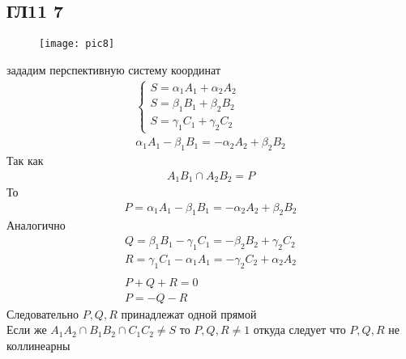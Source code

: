 \subsection*{ГЛ11 7}
\begin{figure}[h]
	\texttt{[image: pic8]}
\end{figure}
зададим перспективную систему координат
\begin{gather*}
	\begin{cases}
		S = \alpha_1 A_1 + \alpha_2 A_2\\
		S = \beta_1 B_1 + \beta_2 B_2\\
		S = \gamma_1 C_1 + \gamma_2 C_2
	\end{cases}
	\\
	\alpha_1 A_1 - \beta_1 B_1 = -\alpha_2 A_2 + \beta_2 B_2
\end{gather*}
Так как 
\begin{gather*}
	A_1B_1 \cap A_2B_2 = P
\end{gather*}
То
\begin{gather*}
	P = \alpha_1A_1 - \beta_1 B_1 = -\alpha_2 A_2 + \beta_2 B_2
\end{gather*}
Аналогично
\begin{gather*}
	Q = \beta_1 B_1 - \gamma_1 C_1 = -\beta_2 B_2 + \gamma_2 C_2\\
	R = \gamma_1 C_1 - \alpha_1 A_1 = -\gamma_2 C_2 + \alpha_2 A_2\\
	\\
	P+Q+R = 0\\
	P = -Q-R
\end{gather*}
Следовательно $P,Q,R$ принадлежат одной прямой\\
Если же $A_1A_2 \cap B_1B_2 \cap C_1C_2 \ne S$ то $P,Q,R \ne 1$ откуда следует что $P,Q,R$ не коллинеарны
		 
	